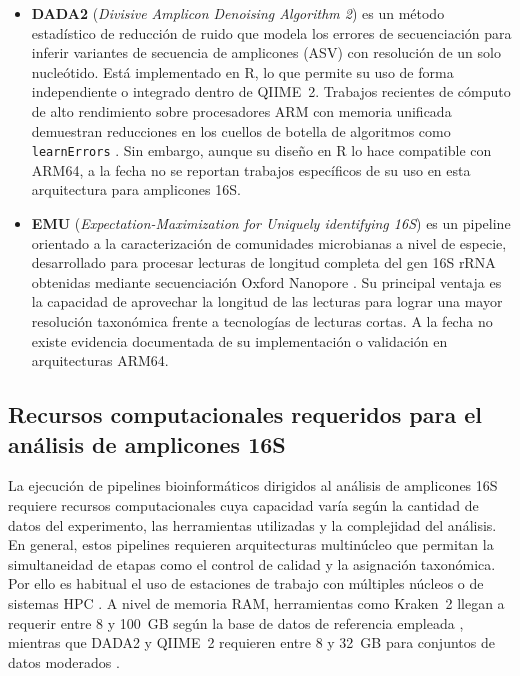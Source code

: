 \documentclass[12pt,oneside,spanish]{book}
\begin{document}
\begin{itemize}
        \item \textbf{DADA2} (\textit{Divisive Amplicon Denoising Algorithm 2}) \citep{callahan2016dada2} es un método estadístico de reducción de ruido que modela los errores de secuenciación para inferir variantes de secuencia de amplicones (ASV) con resolución de un solo nucleótido. Está implementado en R, lo que permite su uso de forma independiente o integrado dentro de QIIME~2. Trabajos recientes de cómputo de alto rendimiento sobre procesadores ARM con memoria unificada demuestran reducciones en los cuellos de botella de algoritmos como \texttt{learnErrors} \citep{applesilicon2025}. Sin embargo, aunque su diseño en R lo hace compatible con ARM64, a la fecha no se reportan trabajos específicos de su uso en esta arquitectura para amplicones 16S.
    
        \item \textbf{EMU} (\textit{Expectation-Maximization for Uniquely identifying 16S}) \citep{curry2022emu} es un pipeline orientado a la caracterización de comunidades microbianas a nivel de especie, desarrollado para procesar lecturas de longitud completa del gen 16S rRNA obtenidas mediante secuenciación Oxford Nanopore \citep{jain2016minion}. Su principal ventaja es la capacidad de aprovechar la longitud de las lecturas para lograr una mayor resolución taxonómica frente a tecnologías de lecturas cortas. A la fecha no existe evidencia documentada de su implementación o validación en arquitecturas ARM64.
    \end{itemize}
    
    \subsection{Recursos computacionales requeridos para el análisis de amplicones 16S}
    
    La ejecución de pipelines bioinformáticos dirigidos al análisis de amplicones 16S requiere recursos computacionales cuya capacidad varía según la cantidad de datos del experimento, las herramientas utilizadas y la complejidad del análisis. En general, estos pipelines requieren arquitecturas multinúcleo que permitan la simultaneidad de etapas como el control de calidad y la asignación taxonómica. Por ello es habitual el uso de estaciones de trabajo con múltiples núcleos o de sistemas HPC \citep{seppey2025lemmi}. A nivel de memoria RAM, herramientas como Kraken~2 llegan a requerir entre 8 y 100~GB según la base de datos de referencia empleada \citep{wood2019kraken2, wood2024manual}, mientras que DADA2 y QIIME~2 requieren entre 8 y 32~GB para conjuntos de datos moderados \citep{callahan2016dada2, bolyen2019qiime2}.
    
\end{document}
